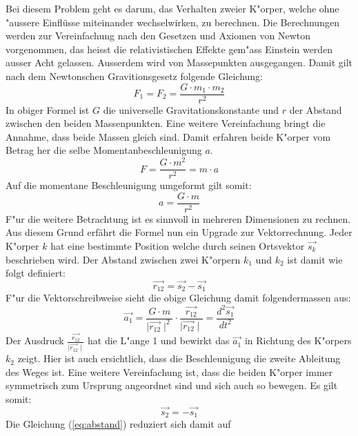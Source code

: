 \begin{refsection}
Bei diesem Problem geht es darum, das Verhalten zweier K"orper, welche ohne "aussere Einflüsse miteinander wechselwirken, zu berechnen. 
Die Berechnungen werden zur Vereinfachung nach den Gesetzen und Axiomen von Newton vorgenommen, das heisst die relativistischen Effekte gem"ass Einstein werden ausser Acht gelassen.
Ausserdem wird von Massepunkten ausgegangen.
Damit gilt nach dem Newtonschen Gravitionsgesetz folgende Gleichung:
\begin{equation} \label{eq:newton}
F_1 = F_2=\frac{G \cdot m_1 \cdot m_2}{r^2}
\end{equation}
In obiger Formel ist $G$ die universelle Gravitationskonstante und $r$ der Abstand zwischen den beiden Massenpunkten.
Eine weitere Vereinfachung bringt die Annahme, dass beide Massen gleich sind. 
Damit erfahren beide K"orper vom Betrag her die selbe Momentanbeschleunigung $a$.
\begin{equation}
F=\frac{G \cdot m^2}{r^2}=m\cdot a
\end{equation}
Auf die momentane Beschleunigung umgeformt gilt somit:
\begin{equation}
a=\frac{G \cdot m}{r^2}
\end{equation}
F"ur die weitere Betrachtung ist es sinnvoll in mehreren Dimensionen zu rechnen.
Aus diesem Grund erfährt die Formel nun ein Upgrade zur Vektorrechnung.
Jeder K"orper $k$ hat eine bestimmte Position welche durch seinen Ortsvektor $\vec{s_k}$ beschrieben wird.
Der Abstand zwischen zwei K"orpern $k_1$ und $k_2$ ist damit wie folgt definiert:
\begin{equation} \label{eq:abstand}
\vec{r_{12}}= \vec{s_2}-\vec{s_1}
\end{equation}
F"ur die Vektorschreibweise sieht die obige Gleichung damit folgendermassen aus:
\begin{equation} \label{eq:gravitationVektor}
\vec{a_1} =\frac{G \cdot m}{\mid \vec{r_{12}}\mid ^2}\cdot \frac{\vec{r_{12}}}{\mid \vec{r_{12}}\mid}=  \frac{d^2 \vec{s_1}}{dt^2}
\end{equation}
Der Ausdruck $\frac{\vec{r_{12}}}{\mid \vec{r_{12}}\mid}$ hat die L"ange 1 und bewirkt das $\vec{a_1}$ in Richtung des K"orpers $k_2$ zeigt.
Hier ist auch ersichtlich, dass die Beschleunigung die zweite Ableitung des Weges ist. 
Eine weitere Vereinfachung ist, dass die beiden K"orper immer symmetrisch zum Ursprung angeordnet sind und sich auch so bewegen.
Es gilt somit:
\begin{equation}
\vec{s_2}=-\vec{s_1}
\end{equation}
Die Gleichung (\ref{eq:abstand}) reduziert sich damit auf

\end{refsection}
